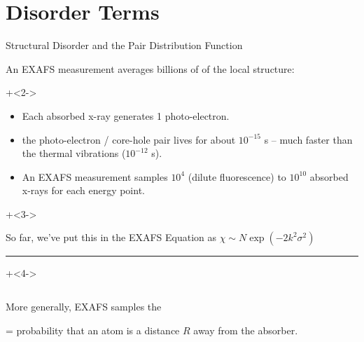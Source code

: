 
\section{Disorder Terms}

\begin{slide}{Structural Disorder and the Pair Distribution Function}

  An EXAFS measurement averages billions of {} of the
  local structure:

\onslide+<2->

\begin{cenpage}{88mm}
\begin{itemize}
\item Each absorbed x-ray generates 1 photo-electron.
\item the photo-electron / core-hole pair lives for about
  $10^{-15}$ s --  much faster than the thermal vibrations ($10^{-12}$ s).
\item An EXAFS measurement samples $10^4$ (dilute fluorescence) to $10^{10}$
  absorbed x-rays for each energy point.
\end{itemize}
\end{cenpage}

\vmm \onslide+<3->
 \vmm

So far, we've put this in the EXAFS Equation as \hspace{2mm}
$\chi \sim N \exp({-2k^2\sigma^2}) $

\vmm \hrule \vmm \onslide+<4->

\begin{columns}
  \begin{column}{50mm}
    More generally, EXAFS samples the

    \vmm
    {}

    \vmm

    {} =   probability that an
    atom is a distance $R$ away from the absorber.

    \vspace{8mm}

    \end{column}
  \begin{column}{70mm}

    \end{column}
  \end{columns}

\end{slide}



